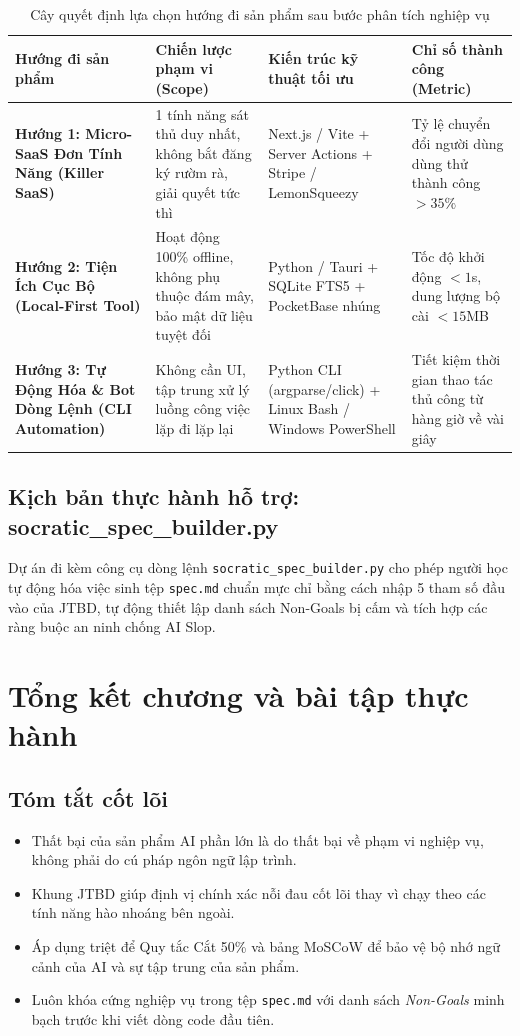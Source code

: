 \documentclass[a4paper,11pt]{article}
\begin{document}
\begin{table}[htbp]
\centering
\small
\caption{Cây quyết định lựa chọn hướng đi sản phẩm sau bước phân tích nghiệp vụ}
\vspace{0.5em}
\begin{tabularx}{\textwidth}{L{3.2cm} L{3.8cm} L{4.5cm} Y}
\toprule
\textbf{Hướng đi sản phẩm} & \textbf{Chiến lược phạm vi (Scope)} & \textbf{Kiến trúc kỹ thuật tối ưu} & \textbf{Chỉ số thành công (Metric)} \\
\midrule
\textbf{Hướng 1: Micro-SaaS Đơn Tính Năng (Killer SaaS)} & 1 tính năng sát thủ duy nhất, không bắt đăng ký rườm rà, giải quyết tức thì & Next.js / Vite + Server Actions + Stripe / LemonSqueezy & Tỷ lệ chuyển đổi người dùng dùng thử thành công $> 35\%$ \\
\textbf{Hướng 2: Tiện Ích Cục Bộ (Local-First Tool)} & Hoạt động 100\% offline, không phụ thuộc đám mây, bảo mật dữ liệu tuyệt đối & Python / Tauri + SQLite FTS5 + PocketBase nhúng & Tốc độ khởi động $< 1$s, dung lượng bộ cài $< 15$MB \\
\textbf{Hướng 3: Tự Động Hóa \& Bot Dòng Lệnh (CLI Automation)} & Không cần UI, tập trung xử lý luồng công việc lặp đi lặp lại & Python CLI (argparse/click) + Linux Bash / Windows PowerShell & Tiết kiệm thời gian thao tác thủ công từ hàng giờ về vài giây \\
\bottomrule
\end{tabularx}
\end{table}

\subsection{Kịch bản thực hành hỗ trợ: socratic\_spec\_builder.py}
Dự án đi kèm công cụ dòng lệnh \texttt{socratic\_spec\_builder.py} cho phép người học tự động hóa việc sinh tệp \texttt{spec.md} chuẩn mực chỉ bằng cách nhập 5 tham số đầu vào của JTBD, tự động thiết lập danh sách Non-Goals bị cấm và tích hợp các ràng buộc an ninh chống AI Slop.

\section{Tổng kết chương và bài tập thực hành}

\subsection{Tóm tắt cốt lõi}
\begin{itemize}[leftmargin=1.5em]
    \item Thất bại của sản phẩm AI phần lớn là do thất bại về phạm vi nghiệp vụ, không phải do cú pháp ngôn ngữ lập trình.
    \item Khung JTBD giúp định vị chính xác nỗi đau cốt lõi thay vì chạy theo các tính năng hào nhoáng bên ngoài.
    \item Áp dụng triệt để Quy tắc Cắt 50\% và bảng MoSCoW để bảo vệ bộ nhớ ngữ cảnh của AI và sự tập trung của sản phẩm.
    \item Luôn khóa cứng nghiệp vụ trong tệp \texttt{spec.md} với danh sách \textit{Non-Goals} minh bạch trước khi viết dòng code đầu tiên.
\end{itemize}
\end{document}
